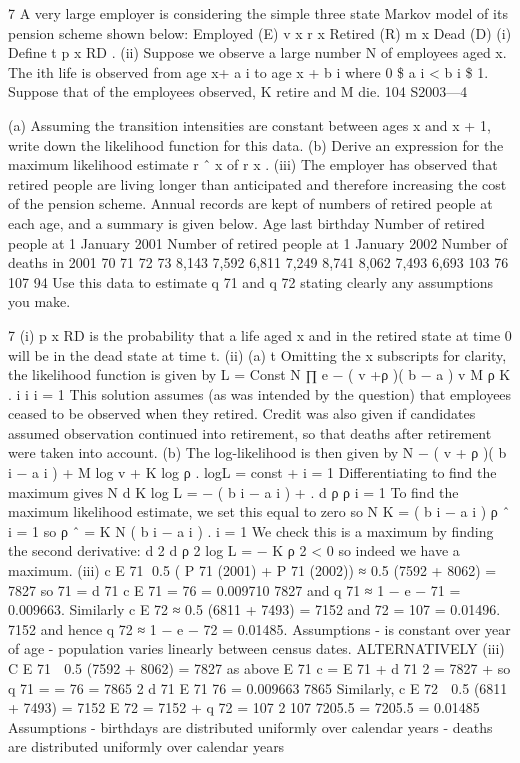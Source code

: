 \documentclass[a4paper,12pt]{article}
\begin{document}
7
A very large employer is considering the simple three state Markov model of its
pension scheme shown below:
Employed (E)
v x
r x
Retired (R)
m x
Dead (D)
(i) Define t p x RD .
(ii) Suppose we observe a large number N of employees aged x. The ith life is
observed from age x+ a i to age x + b i where 0 \$ a i < b i \$ 1. Suppose that of
the employees observed, K retire and M die.
104 S2003—4

(a) Assuming the transition intensities are constant between ages x and
x + 1, write down the likelihood function for this data.
(b) Derive an expression for the maximum likelihood estimate r ˆ x of r x .
(iii)
The employer has observed that retired people are living longer than
anticipated and therefore increasing the cost of the pension scheme. Annual
records are kept of numbers of retired people at each age, and a summary is
given below.
Age last
birthday Number
of retired people
at 1 January 2001 Number
of retired people
at 1 January 2002 Number
of deaths
in 2001
70
71
72
73 8,143
7,592
6,811
7,249 8,741
8,062
7,493
6,693 103
76
107
94
Use this data to estimate q 71 and q 72 stating clearly any assumptions you
make.


7
(i) p x RD is the probability that a life aged x and in the retired state at time 0 will
be in the dead state at time t.
(ii) (a)
t
Omitting the x subscripts for clarity, the likelihood function is given by
L = Const \int
N
∏ e − ( v +ρ )( b − a ) \int v M ρ K .
i
i
i = 1
This solution assumes (as was intended by the question) that
employees ceased to be observed when they retired. Credit was also
given if candidates assumed observation continued into retirement, so
that deaths after retirement were taken into account.
(b)
The log-likelihood is then given by
N
\sum  − ( v + ρ )( b i − a i ) + M log v + K log ρ .
logL = const +
i = 1
Differentiating to find the maximum gives
N
d
K
log L = − \sum  ( b i − a i ) + .
d ρ
ρ
i = 1
To find the maximum likelihood estimate, we set this equal to zero so
N
K
= \sum  ( b i − a i )
ρ ˆ i = 1
so
ρ ˆ =
K
N
\sum  ( b i − a i )
.
i = 1
We check this is a maximum by finding the second derivative:
d 2
d ρ
2
log L = −
K
ρ 2
< 0
so indeed we have a maximum.
(iii)
c
E 71
 0.5 \int ( P 71 (2001) + P 71 (2002))
≈ 0.5 \int (7592 + 8062) = 7827
so \hat{\mu} 71 =
d 71
c
E 71
=
76
= 0.009710
7827
and q 71 ≈ 1 − e −\hat{\mu} 71
= 0.009663.
Similarly
c
E 72
≈ 0.5 \int (6811 + 7493) = 7152
and
\hat{\mu} 72 =
107
= 0.01496.
7152
and hence
q 72 ≈ 1 − e −\hat{\mu} 72 = 0.01485.
Assumptions
- \mu is constant over year of age
- population varies linearly between census dates.
ALTERNATIVELY
(iii)
C
E 71
 0.5 \int (7592 + 8062) = 7827 as above
E 71
c
= E 71
+
d 71
2
= 7827 +
so q 71 =
=
76
= 7865
2
d 71
E 71
76
= 0.009663
7865
Similarly,
c
E 72
 0.5 \int (6811 + 7493) = 7152
E 72 = 7152 +
q 72 =
107
2
107
7205.5
= 7205.5
= 0.01485
Assumptions
- birthdays are distributed uniformly over calendar years
- deaths are distributed uniformly over calendar years
\end{document}
